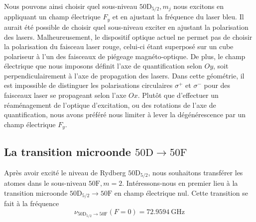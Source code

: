 Nous pouvons ainsi choisir quel sous-niveau $\mathrm{50D}_{5/2},m_j$ nous excitons en appliquant un champ électrique $F_y$ et en ajustant la fréquence du laser bleu.
Il aurait été possible de choisir quel sous-niveau exciter en ajustant la polarisation des lasers.
Malheureusement, le dispositif optique actuel ne permet pas de choisir la polarisation du faisceau laser rouge, celui-ci étant superposé sur un cube polariseur à l'un des faisceaux de piégeage magnéto-optique.
De plus, le champ électrique que nous imposons définit l'axe de quantification selon $Oy$, soit perpendiculairement à l'axe de propagation des lasers.
Dans cette géométrie, il est impossible de distinguer les polarisations circulaires $\sigma^+$ et $\sigma^-$ pour des faisceaux laser se propageant selon l'axe $Ox$.
Plutôt que d'effectuer un réaménagement de l'optique d'excitation, ou des rotations de l'axe de quantification, nous avons préféré nous limiter à lever la dégénérescence par un champ électrique $F_y$.
%
%



\clearpage
	\subsection{La transition microonde $\mathrm{50D \rightarrow 50F}$}\label{subsec:50D50F}
\noindent %
Après avoir excité le niveau de Rydberg $\mathrm{50D}_{5/2}$, nous souhaitons transférer les atomes dans le sous-niveau $\mathrm{50F},m=2$.
Intéressons-nous en premier lieu à la transition microonde $\mathrm{50D_{5/2} \rightarrow 50F}$ en champ électrique nul.
Cette transition se fait à la fréquence
\begin{equation}
\label{eq:freq_50D50F}
\nu_{\mathrm{50D_{5/2}\rightarrow50F}}(F=0)%
= \SI{72.9594}{\GHz}
\end{equation}

